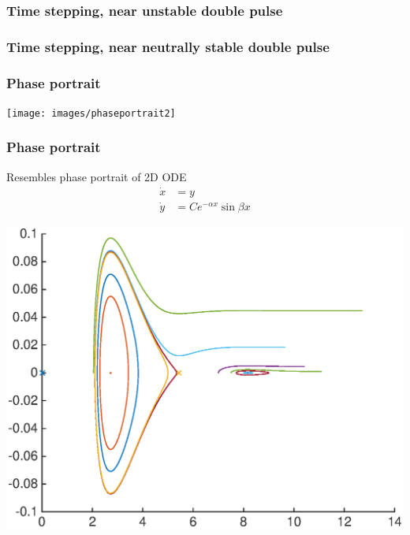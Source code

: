 \documentclass[16pt]{beamer}
\begin{document}
\begin{frame}
	\frametitle{Time stepping, near unstable double pulse}
	\fontsize{16}{7.2}\selectfont
	\begin{center}
	\end{center}
\end{frame}

\begin{frame}
	\frametitle{Time stepping, near neutrally stable double pulse}
	\fontsize{16}{7.2}\selectfont
	\begin{center}
	\end{center}
\end{frame}

\begin{frame}
	\frametitle{Phase portrait}
	\fontsize{16}{7.2}\selectfont
	\begin{center}
	\texttt{[image: images/phaseportrait2]}
	\end{center}
\end{frame}

\begin{frame}
	\frametitle{Phase portrait}
	\fontsize{16}{7.2}\selectfont
	Resembles phase portrait of 2D ODE
	\begin{align*}
	\dot{x} &= y \\
	\dot{y} &= C e^{-\alpha x} \sin \beta x
	\end{align*}
	\begin{center}
	\includegraphics[width=0.65\linewidth]{images/simplephaseportrait}
	\end{center}
\end{frame}
\end{document}
